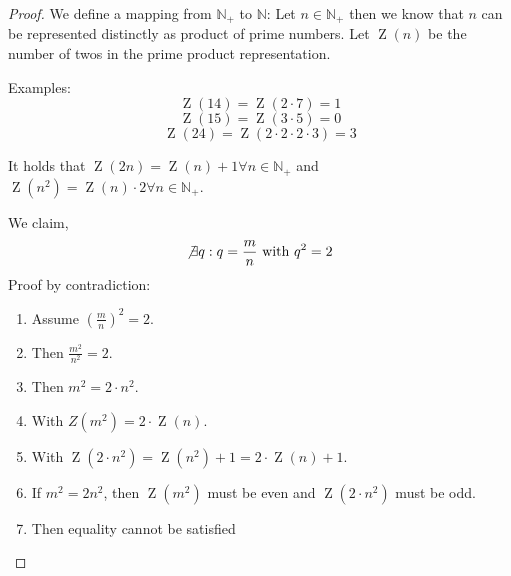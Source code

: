 \documentclass[a4paper,landscape,twocolumn]{article}
\theoremstyle{definition}
\begin{document}
\begin{proof}
  We define a mapping from $\mathbb N_+$ to $\mathbb N$:
  Let $n \in \mathbb N_+$ then we know that $n$ can be represented distinctly
  as product of prime numbers. Let $\operatorname{Z}(n)$ be the number of twos
  in the prime product representation.

  Examples:
  \[ \operatorname{Z}(14) = \operatorname{Z}(2 \cdot 7) = 1 \]
  \[ \operatorname{Z}(15) = \operatorname{Z}(3 \cdot 5) = 0 \]
  \[ \operatorname{Z}(24) = \operatorname{Z}(2 \cdot 2 \cdot 2 \cdot 3) = 3 \]

  It holds that $\operatorname{Z}(2n) = \operatorname{Z}(n) + 1 \forall n \in \mathbb N_+$
  and $\operatorname{Z}(n^2) = \operatorname{Z}(n) \cdot 2 \forall n \in \mathbb N_+$.

  We claim,
  \[ \not\exists q: q = \frac mn \text{ with } q^2 = 2 \]
  Proof by contradiction:
  \begin{enumerate}
    \item Assume $\left(\frac mn\right)^2 = 2$.
    \item Then $\frac{m^2}{n^2} = 2$.
    \item Then $m^2 = 2 \cdot n^2$.
    \item With $Z(m^2) = 2\cdot \operatorname{Z}(n)$.
    \item With $\operatorname{Z}(2\cdot n^2) = \operatorname{Z}(n^2) + 1 = 2 \cdot \operatorname{Z}(n) + 1$.
    \item If $m^2 = 2n^2$, then $\operatorname{Z}(m^2)$ must be even and $\operatorname{Z}(2\cdot n^2)$ must be odd.
    \item Then equality cannot be satisfied \lightning
  \end{enumerate}
\end{proof}
\end{document}
